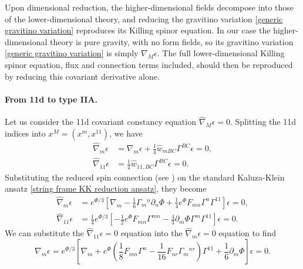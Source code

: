 Upon dimensional reduction, the higher-dimensional fields decompose into those of the lower-dimensional theory, and reducing the gravitino variation \eqref{generic gravitino variation} reproduces its Killing spinor equation.
In our case the higher-dimensional theory is pure gravity, with no form fields, so its gravitino variation \eqref{generic gravitino variation} is simply $\nabla_M\epsilon$.
The full lower-dimensional Killing spinor equation, flux and connection terms included, should then be reproduced by reducing this covariant derivative alone.

\paragraph{From 11d to type IIA.}
Let us consider the 11d covariant constancy equation $\widehat{\nabla}_M \epsilon = 0$.
Splitting the 11d indices into $x^M = (x^m, x^{11})$, we have
\begin{equation}
\begin{aligned}
\widehat{\nabla}_m \epsilon 
&= \nabla_m \epsilon + \frac{1}{4} \widehat{w}_{mBC} \Gamma^{BC} \epsilon = 0,\\  
\widehat{\nabla}_{11} \epsilon 
&= \frac{1}{4} \widehat{w}_{11,BC} \Gamma^{BC} \epsilon = 0.
\end{aligned}
\end{equation}
Substituting the reduced spin connection (see \cite{Ortin:2015hya}) on the standard Kaluza-Klein ansatz \eqref{string frame KK reduction ansatz}, they become
\begin{equation}
\begin{aligned}
\widehat{\nabla}_m \epsilon
&= e^{\Phi/3}\left[ \nabla_m - \frac{1}{6} \Gamma_m{}^n \partial_n \Phi + \frac{1}{4} e^\Phi F_{mn} \Gamma^n \Gamma^{11} \right] \epsilon = 0,\\
\widehat{\nabla}_{11} \epsilon
&=\frac{1}{4} e^{\Phi/3} \left[ -\frac{1}{2} e^{\Phi} F_{mn} \Gamma^{mn} - \frac{4}{3}\partial_m \Phi \Gamma^m \Gamma^{11} \right] \epsilon = 0.
\end{aligned}
\end{equation}
We can substitute the $\widehat{\nabla}_{11} \epsilon = 0$ equation into the $\widehat{\nabla}_m \epsilon = 0$ equation to find
\begin{equation}
\nabla_m \epsilon = e^{\Phi/3} \left[ \nabla_m + e^\Phi \left(\frac{1}{8}F_{mn}\Gamma^n - \frac{1}{16}F_{nr}\Gamma_m{}^{nr}\right) \Gamma^{11} + \frac{1}{6}\partial_m\Phi \right] \epsilon = 0.
\end{equation}
